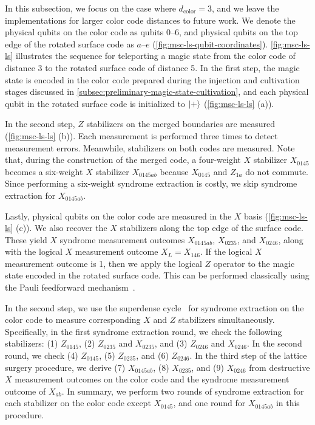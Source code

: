 In this subsection, we focus on the case where $d_\mathrm{color} = 3$, and we leave the implementations for larger color code distances to future work.
We denote the physical qubits on the color code as qubits 0--6, and physical qubits on the top edge of the rotated surface code as $a$--$e$ (\autoref{fig:msc-ls-qubit-coordinates}).
\autoref{fig:msc-ls-ls} illustrates the sequence for teleporting a magic state from the color code of distance 3 to the rotated surface code of distance 5.
In the first step, the magic state is encoded in the color code prepared during the injection and cultivation stages discussed in \autoref{subsec:preliminary-magic-state-cultivation}, and each physical qubit in the rotated surface code is initialized to $\ket{+}$ (\autoref{fig:msc-ls-ls} (a)).

In the second step, $Z$ stabilizers on the merged boundaries are measured (\autoref{fig:msc-ls-ls} (b)).
Each measurement is performed three times to detect measurement errors.
Meanwhile, stabilizers on both codes are measured.
Note that, during the construction of the merged code, a four-weight $X$ stabilizer $X_{0145}$ becomes a six-weight $X$ stabilizer $X_{0145ab}$ because $X_{0145}$ and $Z_{1a}$ do not commute.
Since performing a six-weight syndrome extraction is costly, we skip syndrome extraction for $X_{0145ab}$.

Lastly, physical qubits on the color code are measured in the $X$ basis (\autoref{fig:msc-ls-ls} (c)). 
We also recover the $X$ stabilizers along the top edge of the surface code. 
These yield $X$ syndrome measurement outcomes $X_{0145ab}$, $X_{0235}$, and $X_{0246}$, along with the logical $X$ measurement outcome $X_L = X_{146}$.
If the logical $X$ measurement outcome is 1, then we apply the logical $Z$ operator to the magic state encoded in the rotated surface code.
This can be performed classically using the Pauli feedforward mechanism~\cite{riesebos2017pauli}.

In the second step, we use the superdense cycle~\cite{gidney2023new} for syndrome extraction on the color code to measure corresponding $X$ and $Z$ stabilizers simultaneously.
Specifically, in the first syndrome extraction round, we check the following stabilizers: (1) $Z_{0145}$, (2) $Z_{0235}$ and $X_{0235}$, and (3) $Z_{0246}$ and $X_{0246}$.
In the second round, we check (4) $Z_{0145}$, (5) $Z_{0235}$, and (6) $Z_{0246}$.
In the third step of the lattice surgery procedure, we derive (7) $X_{0145ab}$, (8) $X_{0235}$, and (9) $X_{0246}$ from destructive $X$ measurement outcomes on the color code and the syndrome measurement outcome of $X_{ab}$.
In summary, we perform two rounds of syndrome extraction for each stabilizer on the color code except $X_{0145}$, and one round for $X_{0145ab}$ in this procedure.

